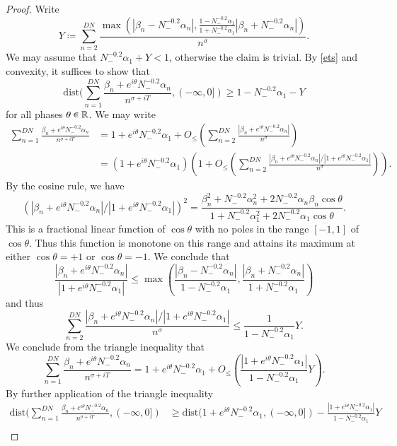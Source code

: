 \begin{proof}
Write 
$$ Y \coloneqq \sum_{n=2}^{DN} \frac{\max(|\beta_n-N_-^{-0.2} \alpha_n|, \frac{1-N_-^{-0.2} \alpha_1}{1+N_-^{-0.2} \alpha_1} |\beta_n+N_-^{-0.2} \alpha_n|)}{n^{\sigma}}.$$
We may assume that $N_-^{-0.2} \alpha_1+Y < 1$, otherwise the claim is trivial.  By \eqref{ets} and convexity, it suffices to show that
$$
\mathrm{dist}( \sum_{n=1}^{DN} \frac{\beta_n + e^{i\theta} N_-^{-0.2} \alpha_n}{n^{\sigma+iT}}, (-\infty,0]) \geq 1 - N_-^{-0.2} \alpha_1 - Y$$
for all phases $\theta \in \mathbb{R}$.  We may write
\begin{align*}
\sum_{n=1}^{DN} \frac{\beta_n + e^{i\theta} N_-^{-0.2} \alpha_n}{n^{\sigma+iT}} &= 1 + e^{i\theta} N_-^{-0.2} \alpha_1 + O_{\leq}\left( \sum_{n=2}^{DN}
\frac{|\beta_n + e^{i\theta} N_-^{-0.2} \alpha_n|}{n^{\sigma}} \right) \\
&=
(1 + e^{i\theta} N_-^{-0.2} \alpha_1) \left(1 + O_{\leq}\left( \sum_{n=2}^{DN}
\frac{|\beta_n + e^{i\theta} N_-^{-0.2} \alpha_n|/|1+e^{i\theta} N_-^{-0.2} \alpha_1|}{n^{\sigma}} \right) \right).
\end{align*}
By the cosine rule, we have
$$ \left(|\beta_n + e^{i\theta} N_-^{-0.2} \alpha_n| / |1 + e^{i\theta} N_-^{-0.2} \alpha_1|\right)^2 = \frac{\beta_n^2 + N_-^{-0.2} \alpha_n^2 + 2 N_-^{-0.2} \alpha_n \beta_n \cos \theta}{1 + N_-^{-0.2} \alpha_1^2 + 2 N_-^{-0.2} \alpha_1 \cos \theta}.$$
This is a fractional linear function of $\cos \theta$ with no poles in the range $[-1,1]$ of $\cos \theta$.  Thus this function is monotone on this range and attains its maximum at either $\cos \theta=+1$ or $\cos \theta = -1$.  We conclude that
$$ \frac{|\beta_n + e^{i\theta} N_-^{-0.2} \alpha_n|}{|1 + e^{i\theta} N_-^{-0.2} \alpha_1|} \leq \max\left( \frac{|\beta_n-N_-^{-0.2} \alpha_n|}{1-N_-^{-0.2} \alpha_1}, \frac{|\beta_n+N_-^{-0.2} \alpha_n|}{1+N_-^{-0.2} \alpha_1} \right)$$
and thus
$$ \sum_{n=2}^{DN} \frac{|\beta_n + e^{i\theta} N_-^{-0.2} \alpha_n|/|1+e^{i\theta} N_-^{-0.2} \alpha_1|}{n^{\sigma}} \leq \frac{1}{1-N_-^{-0.2} \alpha_1} Y.$$
We conclude from the triangle inequality that
$$ \sum_{n=1}^{DN} \frac{\beta_n + e^{i\theta} N_-^{-0.2} \alpha_n}{n^{\sigma+iT}} = 1 + e^{i\theta} N_-^{-0.2} \alpha_1 + O_{\leq}\left( \frac{|1+e^{i\theta} N_-^{-0.2} \alpha_1|}{1-N_-^{-0.2} \alpha_1} Y \right).$$
By further application of the triangle inequality
\begin{align*}
\mathrm{dist}( \sum_{n=1}^{DN} \frac{\beta_n + e^{i\theta} N_-^{-0.2} \alpha_n}{n^{\sigma+iT}}, (-\infty,0]) &\geq \mathrm{dist}( 1 + e^{i\theta} N_-^{-0.2} \alpha_1, (-\infty,0]) - \frac{|1+e^{i\theta} N_-^{-0.2} \alpha_1|}{1-N_-^{-0.2} \alpha_1} Y \\

\end{align*}
\end{proof}
